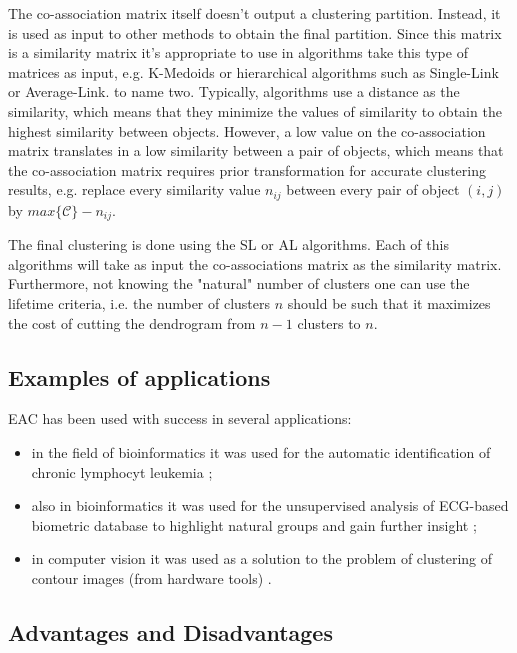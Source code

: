 The co-association matrix itself doesn't output a clustering partition.
Instead, it is used as input to other methods to obtain the final partition.
Since this matrix is a similarity matrix it's appropriate to use in algorithms take this type of matrices as input, e.g. K-Medoids or hierarchical algorithms such as Single-Link or Average-Link.
to name two.
Typically, algorithms use a distance as the similarity, which means that they minimize the values of similarity to obtain the highest similarity between objects.
However, a low value on the co-association matrix translates in a low similarity between a pair of objects, which means that the co-association matrix requires prior transformation for accurate clustering results, e.g. replace every similarity value $n_{ij}$ between every pair of object $(i,j)$ by $max \{ \mathcal{C} \} - n_{ij}$.

The final clustering is done using the SL or AL algorithms.
Each of this algorithms will take as input the co-associations matrix as the similarity matrix.
Furthermore, not knowing the "natural" number of clusters one can use the lifetime criteria, i.e. the number of clusters $n$ should be such that it maximizes the cost of cutting the dendrogram from $n-1$ clusters to $n$.


\subsection{Examples of applications}

EAC has been used with success in several applications:
\begin{itemize}
	\item in the field of bioinformatics it was used for the automatic identification of chronic lymphocyt leukemia \cite{Qian2010};
	\item also in bioinformatics it was used for the unsupervised analysis of ECG-based biometric database to highlight natural groups and gain further insight \cite{LourencoECG2009};
	\item in computer vision it was used as a solution to the problem of clustering of contour images (from hardware tools) \cite{Lourenco2007}.
\end{itemize}

\subsection{Advantages and Disadvantages}

